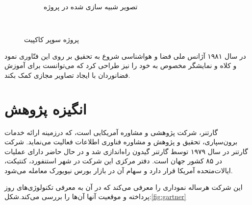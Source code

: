 \begin{figure}
\begin{subfigure}[b]{0.5\textwidth}
		\caption{تصویر شبیه سازی شده در پروژه}
		\label{fig:tiger}
	\end{subfigure}
	~ %
	
	\caption{پروژه سوپر کاکپیت \cite{Furness2}}\label{fig:Super-Cockpit}
\end{figure}


در سال ۱۹۸۱ آژانس ملی فضا و هواشناسی  شروع به تحقیق بر روی این فنّاوری نمود و کلاه و نمایشگر مخصوص به خود را نیز طراحی کرد که می‌توانست برای آموزش فضانوردان با ایجاد تصاویر مجازی کمک بکند\cite{Furness2}.

\section{انگیزه پژوهش}
\noindent
گارتنر، شرکت پژوهشی و مشاوره آمریکایی است، که درزمینه ارائه خدمات برون‌سپاری، تحقیق و پژوهش و مشاوره فناوری اطلاعات فعالیت می‌نماید. شرکت گارتنر در سال ۱۹۷۹ توسط گارتنر گیدون  راه‌اندازی شد و در حال حاضر دارای عملیات در ۸۵ کشور جهان است. دفتر مرکزی این شرکت در شهر استنفورد، کنتیکت، ایالات‌متحده آمریکا قرار دارد و سهام آن در بازار بورس نیویورک معامله می‌شود.

این شرکت هرساله نموداری را معرفی می‌کند که در آن به معرفی تکنولوژی‌های روز پرداخته و موقعیت آنها آن‌ها را بررسی می‌کند.شکل:\ref{fig:gartner}
\\

